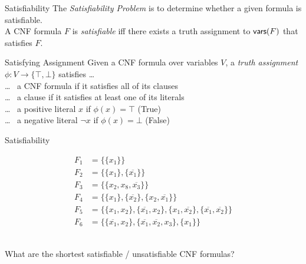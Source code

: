 \documentclass[t]{sdqbeamer}
\begin{document}
\begin{frame}{Satisfiability}
The \emph{Satisfiability Problem} is to determine whether a given formula is satisfiable.\\[1ex]
A CNF formula $F$ is \emph{satisfiable} iff there exists a truth assignment to $\textsf{vars} (F)$ that satisfies $F$.\\[1ex]
\begin{block}{Satisfying Assignment}
Given a CNF formula over variables $V$, a \emph{truth assignment} $\phi : V \longrightarrow \{ \top, \bot \}$ satisfies \dots \\[1em]
\dots~ a CNF formula if it satisfies all of its clauses \\[1ex]
\dots~ a clause if it satisfies at least one of its literals \\[1ex]
\dots~ a positive literal $x$ if $\phi(x)=\top$ (True)\\[1ex]
\dots~ a negative literal $\lnot x$ if $\phi(x)=\bot$ (False)\\[1ex]
\end{block}
\end{frame}

\begin{frame}{Satisfiability}
\begin{example}
	\vspace*{-3ex}
	\begin{align*}
		F_1 &= \{ \{ x_1 \} \}\\[1ex]
		F_2 &= \{ \{ x_1 \}, \{ \overline{x_1} \} \}\\[1ex]
		F_3 &= \{ \{ x_2, x_8, \overline{x_3} \} \}\\[1ex]
		F_4 &= \{ \{ x_1 \}, \{ \overline{x_2} \}, \{ x_2, \overline{x_1} \} \}\\[1ex]
		F_5 &= \{ \{ x_1, x_2 \}, \{ \overline{x_1}, x_2 \}, \{ x_1, \overline{x_2} \}, \{ \overline{x_1}, \overline{x_2} \} \}\\[1ex]
		F_6 &= \{ \{ \overline{x_1}, x_2 \}, \{ \overline{x_1}, \overline {x_2}, x_3 \}, \{ x_1 \} \}
	\end{align*}
\end{example}~\\
\pause
{} What are the shortest satisfiable / unsatisfiable CNF formulas?
\end{frame}
\end{document}
